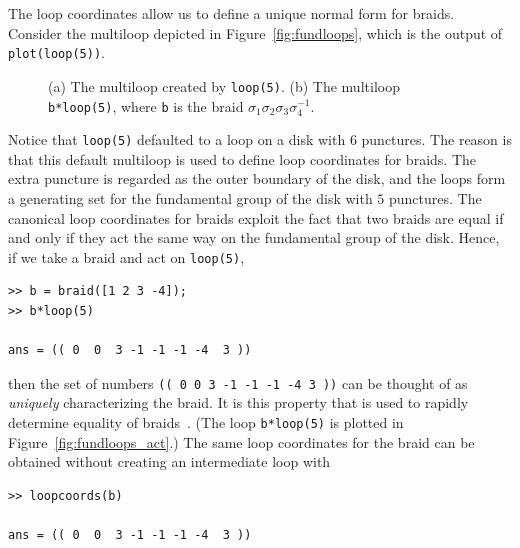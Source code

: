 \documentclass[12pt]{article}
\begin{document}
The loop coordinates allow us to define a unique normal form for
braids.  Consider the multiloop depicted in
Figure~\ref{fig:fundloops}, which is the output of \lstinline{plot(loop(5))}.
%
\begin{figure}
\begin{center}
\hspace{1em}
\end{center}
\caption{(a) The multiloop created by \lstinline{loop(5)}.  (b) The
  multiloop \lstinline{b*loop(5)}, where \lstinline{b} is the braid
  $\sigma_1\sigma_2\sigma_3\sigma_4^{-1}$.}
\end{figure}
%
Notice that \lstinline{loop(5)} defaulted to a loop on a disk with $6$
punctures.  The reason is that this default multiloop is used to
define loop coordinates for braids.  The extra puncture is regarded as
the outer boundary of the disk, and the loops form a generating set
for the fundamental group of the disk with $5$ punctures.  The
canonical loop coordinates for braids exploit the fact that two
braids are equal if and only if they act the same way on the
fundamental group of the disk.  Hence, if we take a braid and act on
\lstinline{loop(5)},
\begin{lstlisting}[frame=single,framerule=0pt]
>> b = braid([1 2 3 -4]);
>> b*loop(5)

ans = (( 0  0  3 -1 -1 -1 -4  3 ))
\end{lstlisting}
then the set of numbers \lstinline{(( 0 0 3 -1 -1 -1 -4 3 ))} can be
thought of as \emph{uniquely} characterizing the braid.  It is this
property that is used to rapidly determine equality of
braids~\citep{Dehornoy2008}.  (The loop \lstinline{b*loop(5)} is
plotted in Figure~\ref{fig:fundloops_act}.)  The same loop coordinates
for the braid can be obtained without creating an intermediate loop
with
\begin{lstlisting}[frame=single,framerule=0pt]
>> loopcoords(b)

ans = (( 0  0  3 -1 -1 -1 -4  3 ))
\end{lstlisting}
\end{document}
